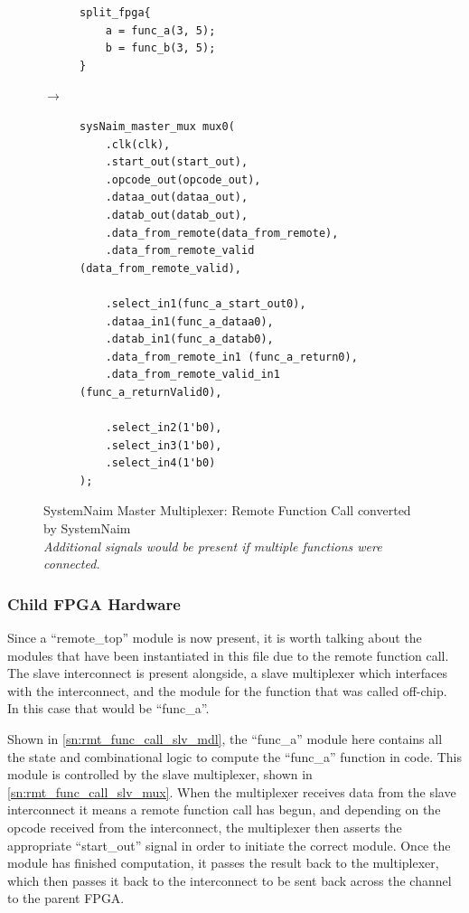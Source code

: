 \begin{figure}[H]
\centering
\begin{subfigure}{0.32\textwidth}
    \centering
    \begin{verbatim}
split_fpga{
    a = func_a(3, 5);
    b = func_b(3, 5);
}
\end{verbatim}
\end{subfigure}%
{\LARGE$\rightarrow$}%
\begin{subfigure}{0.58\textwidth}
    \begin{verbatim}
sysNaim_master_mux mux0(
    .clk(clk),
    .start_out(start_out),
    .opcode_out(opcode_out),
    .dataa_out(dataa_out),
    .datab_out(datab_out),
    .data_from_remote(data_from_remote),
    .data_from_remote_valid (data_from_remote_valid),

    .select_in1(func_a_start_out0),
    .dataa_in1(func_a_dataa0),
    .datab_in1(func_a_datab0),
    .data_from_remote_in1 (func_a_return0),
    .data_from_remote_valid_in1 (func_a_returnValid0),

    .select_in2(1'b0),
    .select_in3(1'b0),
    .select_in4(1'b0)
);
    \end{verbatim}
\end{subfigure}
\caption{SystemNaim Master Multiplexer: Remote Function Call converted by SystemNaim \\ \textit{Additional signals would be present if multiple functions were connected.}}
\label{sn:rmt_func_call_mst_mux}
\end{figure}

\subsubsection{Child FPGA Hardware}

Since a “remote\_top” module is now present, it is worth talking about the modules that have been instantiated in this file due to the remote function call. The slave interconnect is present alongside, a slave multiplexer which interfaces with the interconnect, and the module for the function that was called off-chip. In this case that would be “func\_a”.

Shown in \autoref{sn:rmt_func_call_slv_mdl}, the “func\_a” module here contains all the state and combinational logic to compute the “func\_a” function in code. This module is controlled by the slave multiplexer, shown in \autoref{sn:rmt_func_call_slv_mux}. When the multiplexer receives data from the slave interconnect it means a remote function call has begun, and depending on the opcode received from the interconnect, the multiplexer then asserts the appropriate “start\_out” signal in order to initiate the correct module. Once the module has finished computation, it passes the result back to the multiplexer, which then passes it back to the interconnect to be sent back across the channel to the parent FPGA.

